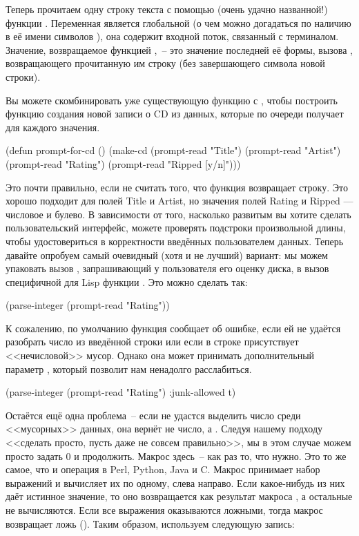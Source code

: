 Теперь прочитаем одну строку текста с помощью (очень удачно названной!) функции
. Переменная  является глобальной (о чем можно
догадаться по наличию в её имени символов \code{*}), она содержит входной поток, связанный
с терминалом. Значение, возвращаемое функцией ,~-- это значение
последней её формы, вызова , возвращающего прочитанную им строку (без
завершающего символа новой строки).

Вы можете скомбинировать уже существующую функцию  с ,
чтобы построить функцию создания новой записи о CD из данных, которые  по
очереди получает для каждого значения.

\begin{myverb}
(defun prompt-for-cd ()
 (make-cd
  (prompt-read "Title")
  (prompt-read "Artist")
  (prompt-read "Rating")
  (prompt-read "Ripped [y/n]")))
\end{myverb}

Это почти правильно, если не считать того, что функция  возвращает
строку. Это хорошо подходит для полей Title и Artist, но значения полей Rating и Ripped
--- числовое и булево. В зависимости от того, насколько развитым вы хотите сделать
пользовательский интерфейс, можете проверять подстроки произвольной длины, чтобы
удостовериться в корректности введённых пользователем данных. Теперь давайте опробуем
самый очевидный (хотя и не лучший) вариант: мы можем упаковать вызов ,
запрашивающий у пользователя его оценку диска, в вызов специфичной для Lisp функции
. Это можно сделать так:

\begin{myverb}
(parse-integer (prompt-read "Rating"))
\end{myverb}

К сожалению, по умолчанию функция  сообщает об ошибке, если ей не
удаётся разобрать число из введённой строки или если в строке присутствует <<нечисловой>>
мусор. Однако она может принимать дополнительный параметр , который позволит
нам ненадолго расслабиться.

\begin{myverb}
(parse-integer (prompt-read "Rating") :junk-allowed t)
\end{myverb}

Остаётся ещё одна проблема~-- если  не удастся выделить число среди
<<мусорных>> данных, она вернёт не число, а . Следуя нашему подходу <<сделать
просто, пусть даже не совсем правильно>>, мы в этом случае можем просто задать 0 и
продолжить. Макрос  здесь~-- как раз то, что нужно. Это то же самое, что и
операция \code{||} в Perl, Python, Java и C. Макрос принимает набор выражений и
вычисляет их по одному, слева направо. Если какое-нибудь из них даёт истинное значение, то
оно возвращается как результат макроса , а остальные не вычисляются. Если
все выражения оказываются ложными, тогда макрос  возвращает ложь
(). Таким образом, используем следующую запись:

